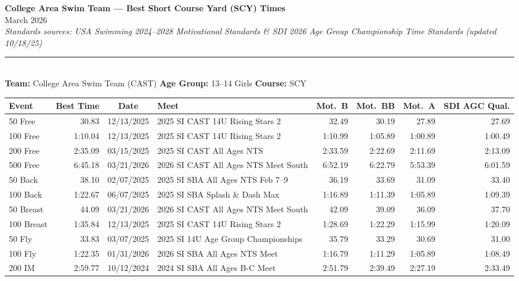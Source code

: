 \documentclass[11pt]{article}
\begin{document}
\pagestyle{empty}

\begin{center}
  {\large\color{castblue}\textbf{College Area Swim Team --- Best Short Course Yard (SCY) Times}}\\[4pt]
  {\normalsize March 2026}\\[3pt]
  {\footnotesize\itshape Standards sources: USA Swimming 2024--2028 Motivational Standards \&
  SDI 2026 Age Group Championship Time Standards (updated 10/18/25)}
\end{center}

\medskip
\noindent\rule{\textwidth}{0.4pt}
\medskip

\\[3pt]
\textbf{Team:} College Area Swim Team (CAST)\quad
\textbf{Age Group:} 13--14 Girls\quad
\textbf{Course:} SCY

\smallskip

\noindent\begin{tabular}{lrcp{2.9in}rrrr}
\toprule
\textbf{Event} & \textbf{Best Time} & \textbf{Date} & \textbf{Meet} &
\textbf{Mot.\ B} & \textbf{Mot.\ BB} & \textbf{Mot.\ A} & \textbf{SDI AGC Qual.}\\
\midrule
50 Free     & 30.83   & 12/13/2025 & 2025 SI CAST 14U Rising Stars 2        & 32.49   & 30.19   & 27.89   & 27.69   \\
100 Free    & 1:10.04 & 12/13/2025 & 2025 SI CAST 14U Rising Stars 2        & 1:10.99 & 1:05.89 & 1:00.89 & 1:00.49 \\
200 Free    & 2:35.09 & 03/15/2025 & 2025 SI CAST All Ages NTS              & 2:33.59 & 2:22.69 & 2:11.69 & 2:13.09 \\
500 Free    & 6:45.18 & 03/21/2026 & 2026 SI CAST All Ages NTS Meet South   & 6:52.19 & 6:22.79 & 5:53.39 & 6:01.59 \\
50 Back     & 38.10   & 02/07/2025 & 2025 SI SBA All Ages NTS Feb 7--9     & 36.19   & 33.69   & 31.09   & 33.40   \\
100 Back    & 1:22.67 & 06/07/2025 & 2025 SI SBA Splash \& Dash Max        & 1:16.89 & 1:11.39 & 1:05.89 & 1:09.39 \\
50 Breast   & 44.09   & 03/21/2026 & 2026 SI CAST All Ages NTS Meet South   & 42.09   & 39.09   & 36.09   & 37.70   \\
100 Breast  & 1:35.84 & 12/13/2025 & 2025 SI CAST 14U Rising Stars 2        & 1:28.69 & 1:22.29 & 1:15.99 & 1:20.09 \\
50 Fly      & 33.83   & 03/07/2025 & 2025 SI 14U Age Group Championships    & 35.79   & 33.29   & 30.69   & 31.00   \\
100 Fly     & 1:22.35 & 01/31/2026 & 2026 SI SBA All Ages NTS Meet         & 1:16.79 & 1:11.29 & 1:05.89 & 1:08.49 \\
200 IM      & 2:59.77 & 10/12/2024 & 2024 SI SBA All Ages B-C Meet         & 2:51.79 & 2:39.49 & 2:27.19 & 2:33.49 \\
\bottomrule
\end{tabular}
\end{document}
